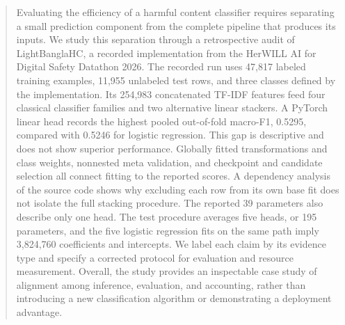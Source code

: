 \documentclass[runningheads]{llncs}
\begin{document}
\begin{abstract}
Evaluating the efficiency of a harmful content classifier requires separating a small prediction component from the complete pipeline that produces its inputs. We study this separation through a retrospective audit of LightBanglaHC, a recorded implementation from the HerWILL AI for Digital Safety Datathon 2026. The recorded run uses 47,817 labeled training examples, 11,955 unlabeled test rows, and three classes defined by the implementation. Its 254,983 concatenated TF-IDF features feed four classical classifier families and two alternative linear stackers. A PyTorch linear head records the highest pooled out-of-fold macro-F1, 0.5295, compared with 0.5246 for logistic regression. This gap is descriptive and does not show superior performance. Globally fitted transformations and class weights, nonnested meta validation, and checkpoint and candidate selection all connect fitting to the reported scores. A dependency analysis of the source code shows why excluding each row from its own base fit does not isolate the full stacking procedure. The reported 39 parameters also describe only one head. The test procedure averages five heads, or 195 parameters, and the five logistic regression fits on the same path imply 3,824,760 coefficients and intercepts. We label each claim by its evidence type and specify a corrected protocol for evaluation and resource measurement. Overall, the study provides an inspectable case study of alignment among inference, evaluation, and accounting, rather than introducing a new classification algorithm or demonstrating a deployment advantage.


\end{abstract}
\end{document}
